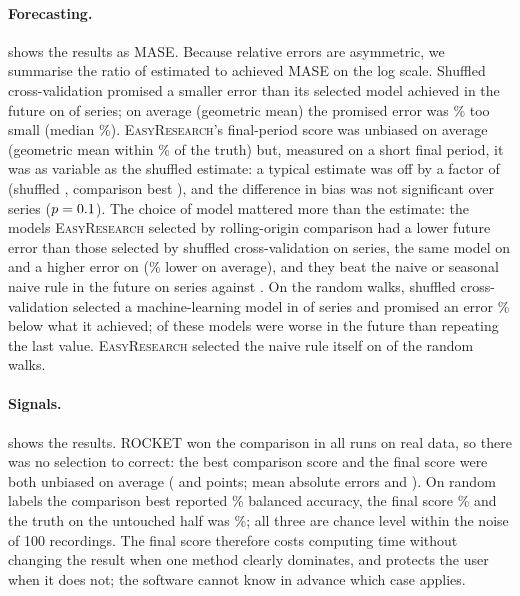 \documentclass[11pt,a4paper]{article}
\newcommand{\ER}{\textsc{EasyResearch}}
\begin{document}


\paragraph{Forecasting.}  shows the results as MASE. Because relative errors are asymmetric, we summarise the ratio of estimated to achieved MASE on the log scale. Shuffled cross-validation promised a smaller error than its selected model achieved in the future on \FcShufBelow{} of \FcNData{} series; on average (geometric mean) the promised error was \FcShufGeo\% too small (median \FcShufMedian\%). \ER's final-period score was unbiased on average (geometric mean within \FcFinalGeo\% of the truth) but, measured on a short final period, it was as variable as the shuffled estimate: a typical estimate was off by a factor of \FcFinalTyp{} (shuffled \FcShufTyp, comparison best \FcCompTyp), and the difference in bias was not significant over \FcNData{} series ($p = 0.1$). The choice of model mattered more than the estimate: the models \ER{} selected by rolling-origin comparison had a lower future error than those selected by shuffled cross-validation on \FcToolBetter{} series, the same model on \FcSame{} and a higher error on \FcToolWorse{} (\FcTruthGain\% lower on average), and they beat the naive or seasonal naive rule in the future on \FcBeatsRule{} series against \FcBeatsRuleShuf. On the random walks, shuffled cross-validation selected a machine-learning model in \FcRWShufML{} of \FcRWn{} series and promised an error \FcRWShufGain\% below what it achieved; \FcRWShufWorse{} of these models were worse in the future than repeating the last value. \ER{} selected the naive rule itself on \FcRWToolNaive{} of the \FcRWn{} random walks.



\paragraph{Signals.}  shows the results. ROCKET won the comparison in all \SigRuns{} runs on real data, so there was no selection to correct: the best comparison score and the final score were both unbiased on average (\SigBiasComp{} and \SigBiasFinal{} points; mean absolute errors \SigMAEComp{} and \SigMAEFinal). On random labels the comparison best reported \SigCtrlComp\% balanced accuracy, the final score \SigCtrlFinal\% and the truth on the untouched half was \SigCtrlTruth\%; all three are chance level within the noise of 100 recordings. The final score therefore costs computing time without changing the result when one method clearly dominates, and protects the user when it does not; the software cannot know in advance which case applies.
\end{document}
